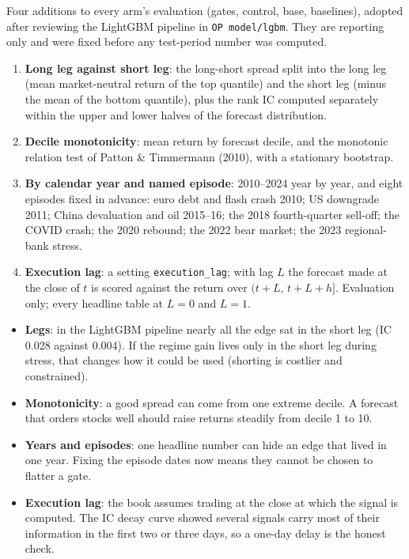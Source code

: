  Four additions to every arm's evaluation (gates, control, base, baselines), adopted after
reviewing the LightGBM pipeline in \texttt{OP model/lgbm}. They are reporting only and were fixed before any
test-period number was computed. 
\begin{enumerate}
\item \textbf{Long leg against short leg}: the long-short spread split into the long leg (mean market-neutral return of
  the top quantile) and the short leg (minus the mean of the bottom quantile), plus the rank IC computed separately
  within the upper and lower halves of the forecast distribution.
\item \textbf{Decile monotonicity}: mean return by forecast decile, and the monotonic relation test of Patton \&
  Timmermann (2010), with a stationary bootstrap.
\item \textbf{By calendar year and named episode}: 2010--2024 year by year, and eight episodes fixed in advance:
  euro debt and flash crash 2010; US downgrade 2011; China devaluation and oil 2015--16; the 2018 fourth-quarter
  sell-off; the COVID crash; the 2020 rebound; the 2022 bear market; the 2023 regional-bank stress.
\item \textbf{Execution lag}: a setting \texttt{execution\_lag}; with lag $L$ the forecast made at the close of $t$ is
  scored against the return over $(t+L,\,t+L+h]$. Evaluation only; every headline table at $L=0$ and $L=1$.
\end{enumerate}

\begin{whybox}
\begin{itemize}
\item \textbf{Legs}: in the LightGBM pipeline nearly all the edge sat in the short leg (IC 0.028 against 0.004). If the
  regime gain lives only in the short leg during stress, that changes how it could be used (shorting is costlier and
  constrained).
\item \textbf{Monotonicity}: a good spread can come from one extreme decile. A forecast that orders stocks well should
  raise returns steadily from decile 1 to 10.
\item \textbf{Years and episodes}: one headline number can hide an edge that lived in one year. Fixing the episode
  dates now means they cannot be chosen to flatter a gate.
\item \textbf{Execution lag}: the book assumes trading at the close at which the signal is computed. The IC decay curve
  showed several signals carry most of their information in the first two or three days, so a one-day delay is the
  honest check.
\end{itemize}
\end{whybox}

